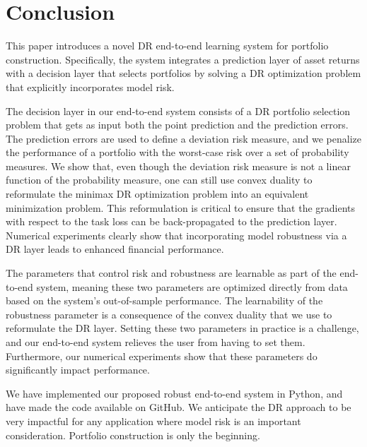 \documentclass[10pt, twocolumn]{article}
\theoremstyle{plain}
\theoremstyle{definition}
\begin{document}
\section{Conclusion}\label{sec:conclusion}

This paper introduces a novel DR end-to-end learning system for 
portfolio construction. Specifically, the system integrates a prediction 
layer of asset returns with a decision layer that selects portfolios by 
solving a DR optimization problem that explicitly incorporates model 
risk.

The decision layer in our end-to-end system consists of a DR portfolio 
selection problem that gets as input both the point prediction and the 
prediction errors. The prediction errors are used to define a deviation 
risk measure, and we penalize the performance of a portfolio with the 
worst-case risk over a set of probability measures. We show that, even 
though the deviation risk measure is not a linear function of the probability 
measure, one can still use convex duality to reformulate the minimax DR 
optimization problem into an equivalent minimization problem. This 
reformulation is critical to ensure that the gradients with respect to the 
task loss can be back-propagated to the prediction layer. Numerical experiments 
clearly show that incorporating model robustness via a DR layer leads to enhanced 
financial performance.

The parameters that control risk and robustness are learnable as part of
the end-to-end system, meaning these two parameters are optimized directly
from data based on the system's out-of-sample performance. The learnability 
of the robustness parameter is a consequence of the convex duality that we 
use to reformulate the DR layer. Setting these two parameters in
practice is a challenge, and our end-to-end system relieves the user from
having to set them. Furthermore, our numerical experiments show that these
parameters do significantly impact performance.

We have implemented our proposed robust end-to-end system in Python, and
have made the code available on GitHub. We anticipate the DR approach 
to be very impactful for any application where model risk is an important
consideration. Portfolio construction is only the beginning.



\end{document}
